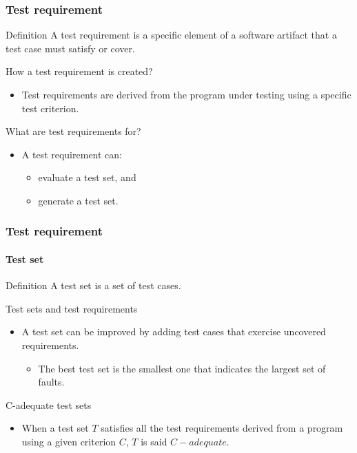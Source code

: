 \begin{frame}[parent={cmap:software-testing},hasnext=true,hasprev=true]
\label{concept:test-requirement}
\frametitle{Test requirement}

\begin{block:concept}{Definition}
A test requirement is a specific element of a software artifact that a test
case must satisfy or cover.
\end{block:concept}

\begin{block:fact}{How a test requirement is created?}
\begin{itemize}
	\item Test requirements are derived from the program under testing using
	a specific test criterion.
\end{itemize}
\end{block:fact}

\begin{block:fact}{What are test requirements for?}
\begin{itemize}
	\item A test requirement can:
	\begin{itemize}
		\item evaluate a test set, and
		\item generate a test set.
	\end{itemize}
\end{itemize}
\end{block:fact}
\end{frame}


\begin{frame}[imacidii]
\label{concept:test-set}
\label{concept:c-adequate-test-set}
\frametitle{Test requirement}
\framesubtitle{Test set}

\begin{block:concept}{Definition}
A test set is a set of test cases.
\end{block:concept}

\begin{block:fact}{Test sets and test requirements}
\begin{itemize}
	\item A test set can be improved by adding test cases that exercise
	uncovered requirements.
	\begin{itemize}
		\item The best test set is the smallest one that indicates the largest
		set of faults.
	\end{itemize}
\end{itemize}
\end{block:fact}

\begin{block:concept}{C-adequate test sets}
\begin{itemize}
	\item When a test set $T$ satisfies all the test requirements derived from
	a program using a given criterion $C$, $T$ is said $C-adequate$.
\end{itemize}
\end{block:concept}
\end{frame}
